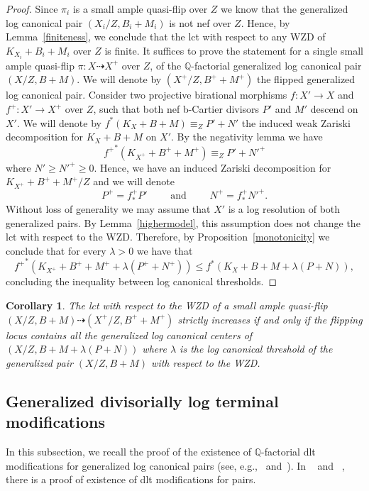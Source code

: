 \documentclass{amsart}
\renewcommand{\qq}{\mathbb{Q}}
\newtheorem{corollary}[theorem]{Corollary}
\theoremstyle{remark}
\numberwithin{equation}{section}
\begin{document}
\begin{proof}
Since $\pi_i$ is a small ample quasi-flip over $Z$
we know that the generalized log canonical pair $(X_i/Z,B_i+M_i)$ is not nef over $Z$.
Hence, by Lemma~\ref{finiteness}, we conclude that the lct with respect to any WZD of $K_{X_i}+B_i+M_i$ over $Z$ is finite.
It suffices to prove the statement for a single small ample quasi-flip $\pi \colon X \dashrightarrow X^+$ over $Z$,  
of the $\qq$-factorial generalized log canonical pair $(X/Z,B+M)$.
We will denote by $(X^{+}/Z,B^{+}+M^{+})$ the flipped generalized log canonical pair.
Consider two projective birational morphisms $f\colon X'\rightarrow X$ and $f^+ \colon X'\rightarrow X^+$ over $Z$,
such that both nef b-Cartier divisors $P'$ and $M'$ descend on $X'$.
We will denote by $f^*(K_X+B+M)\equiv_Z P'+N'$ the induced weak Zariski decomposition for
$K_X+B+M$ on $X'$.
By the negativity lemma we have 
\[
{f^+}^*(K_{X^{+}}+B^{+}+M^{+}) \equiv_Z P' + {N'}^{+}
\]
where $N' \geq {N'}^{+} \geq 0$.
Hence, we have an induced Zariski decomposition for $K_{X^{+}}+B^{+}+M^{+}/Z$
and we will denote 
\[
P^{+}=f^+_*P'\qquad  \text{ and }\qquad  N^{+}=f^{+}_*{N'}^{+}.
\]
Without loss of generality we may assume that $X'$ is a log resolution of both generalized pairs.
By Lemma~\ref{highermodel}, this assumption does not change the lct with respect to the WZD. 
Therefore, by Proposition~\ref{monotonicity} we conclude that for every $\lambda >0$ we have that
\[
{f^+}^*(K_{X^+}+B^{+}+M^{+} +\lambda(P^{+}+N^{+})) \leq
f^*(K_X+B+M+\lambda(P+N)),
\]
concluding the inequality between log canonical thresholds.
\end{proof}

\begin{corollary}
The lct with respect to the WZD of a small ample quasi-flip $(X/Z,B+M)\dashrightarrow (X^{+}/Z,B^{+}+M^{+})$
strictly increases if and only if the flipping locus contains all the generalized log canonical centers of 
$(X/Z,B+M+\lambda(P+N))$ where $\lambda$ is the log canonical threshold
of the generalized pair $(X/Z,B+M)$ with respect to the WZD.
\end{corollary}

\subsection{Generalized divisorially log terminal modifications}
In this subsection, we recall the proof of the existence of $\qq$-factorial 
dlt modifications for generalized log canonical pairs 
(see, e.g.,~\cite[Lemma 4.5]{BZ16} and~\cite[2.13.(2)]{Bir17}).
In ~\cite{AH12} and ~\cite[Theorem 3.1]{KK10}, there is a proof of existence of dlt modifications for pairs.
\end{document}
